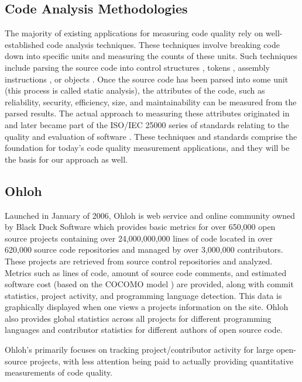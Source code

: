 \documentclass{sig-alternate}
\begin{document}
\subsection{Code Analysis Methodologies}
The majority of existing applications for measuring code quality rely on well-established code analysis techniques. These techniques involve breaking code down into specific units and measuring the counts of these units. Such techniques include parsing the source code into control structures \cite{mccabe1976complexity}, tokens \cite{halstead1977elements}, assembly instructions \cite{park1992software}, or objects \cite{chidamber1994metrics}. Once the source code has been parsed into some unit (this process is called static analysis), the attributes of the code, such as reliability, security, efficiency, size, and maintainability can be measured from the parsed results. The actual approach to measuring these attributes originated in \cite{boehm1976quantitative} and later became part of the ISO/IEC 25000 series of standards relating to the quality and evaluation of software \cite{iso2011iec}. These techniques and standards comprise the foundation for today's code quality measurement applications, and they will be the basis for our approach as well.

\subsection{Ohloh}
Launched in January of 2006, Ohloh \cite{allen2009ohloh} is web service and online community owned by Black Duck Software which provides basic metrics for over 650,000 open source projects containing over 24,000,000,000 lines of code located in over 620,000 source code repositories and managed by over 3,000,000 contributors. These projects are retrieved from source control repositories and analyzed. Metrics such as lines of code, amount of source code comments, and estimated software cost (based on the COCOMO model \cite{boehm2000software}) are provided, along with commit statistics, project activity, and programming language detection. This data is graphically displayed when one views a projects information on the site. Ohloh also provides global statistics across all projects for different programming languages and contributor statistics for different authors of open source code. 

Ohloh's primarily focuses on tracking project/contributor activity for large open-source projects, with less attention being paid to actually providing quantitative measurements of code quality.
\end{document}

